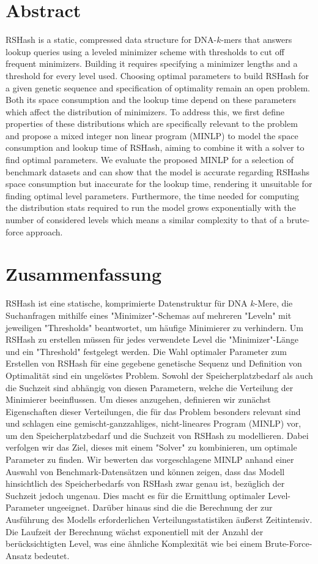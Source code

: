 \documentclass[a4paper,titlepage,onecolumn,oneside,12pt,nenglish,titlepage=firstiscover]{scrbook}
\theoremstyle{plain} %
\theoremstyle{definition} %
\theoremstyle{remark} %
\theoremstyle{plain}
\begin{document}
\section*{Abstract}
RSHash is a static, compressed data structure for DNA-$k$-mers that answers lookup queries using a leveled minimizer scheme with thresholds to cut off frequent minimizers. Building it requires specifying a minimizer lengths and a threshold for every level used. Choosing optimal parameters to build RSHash for a given genetic sequence and specification of optimality remain an open problem. Both its space consumption and the lookup time depend on these parameters which affect the distribution of minimizers. To address this, we first define properties of these distributions which are specifically relevant to the problem and propose a mixed integer non linear program (MINLP) to model the space consumption and lookup time of RSHash, aiming to combine it with a solver to find optimal parameters. We evaluate the proposed MINLP for a selection of benchmark datasets and can show that the model is accurate regarding RSHashs space consumption but inaccurate for the lookup time, rendering it unsuitable for finding optimal level parameters. Furthermore, the time needed for computing the distribution stats required to run the model grows exponentially with the number of considered levels which means a similar complexity to that of a brute-force approach. 

\section*{Zusammenfassung}
RSHash ist eine statische, komprimierte Datenstruktur für DNA $k$-Mere, die Suchanfragen mithilfe eines "Minimizer"-Schemas auf mehreren "Leveln" mit jeweiligen "Thresholds" beantwortet, um häufige Minimierer zu verhindern. Um RSHash zu erstellen müssen für jedes verwendete Level die "Minimizer"-Länge und ein "Threshold" festgelegt werden. Die Wahl optimaler Parameter zum Erstellen von RSHash für eine gegebene genetische Sequenz und Definition von Optimalität sind ein ungelöstes Problem. Sowohl der Speicherplatzbedarf als auch die Suchzeit sind abhängig von diesen Parametern, welche die Verteilung der Minimierer beeinflussen. Um dieses anzugehen, definieren wir zunächst Eigenschaften dieser Verteilungen, die für das Problem besonders relevant sind und schlagen eine gemischt-ganzzahliges, nicht-lineares Program (MINLP) vor, um den Speicherplatzbedarf und die Suchzeit von RSHash zu modellieren. Dabei verfolgen wir das Ziel, dieses mit einem "Solver" zu kombinieren, um optimale Parameter zu finden. Wir bewerten das vorgeschlagene MINLP anhand einer Auswahl von Benchmark-Datensätzen und können zeigen, dass das Modell hinsichtlich des Speicherbedarfs von RSHash zwar genau ist, bezüglich der Suchzeit jedoch ungenau. Dies macht es für die Ermittlung optimaler Level-Parameter ungeeignet. Darüber hinaus sind die die Berechnung der zur Ausführung des Modells erforderlichen Verteilungsstatistiken äußerst Zeitintensiv. Die Laufzeit der Berechnung wächst exponentiell mit der Anzahl der berücksichtigten Level, was eine ähnliche Komplexität wie bei einem Brute-Force-Ansatz bedeutet. 
\end{document}
